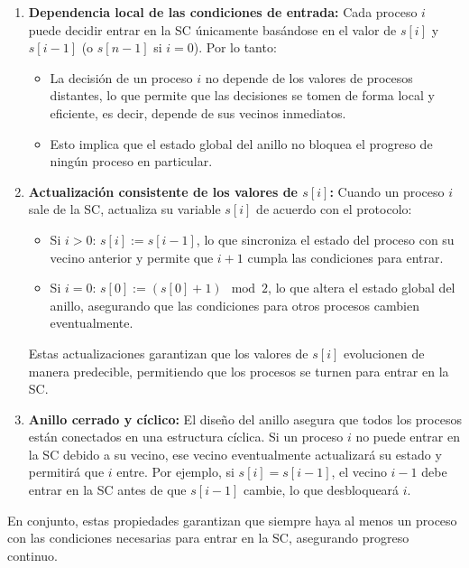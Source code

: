 \documentclass[a4paper,12pt]{article}
\begin{document}
\begin{enumerate}
    \item \textbf{Dependencia local de las condiciones de entrada:}  
    Cada proceso $i$ puede decidir entrar en la SC únicamente basándose en el valor de $s[i]$ y $s[i-1]$ (o $s[n-1]$ si $i = 0$). Por lo tanto:
    \begin{itemize}
        \item La decisión de un proceso $i$ no depende de los valores de procesos distantes, lo que permite que las decisiones se tomen de forma local y eficiente, es decir, depende de sus vecinos inmediatos.
        \item Esto implica que el estado global del anillo no bloquea el progreso de ningún proceso en particular.
    \end{itemize}

    \item \textbf{Actualización consistente de los valores de $s[i]$:}  
    Cuando un proceso $i$ sale de la SC, actualiza su variable $s[i]$ de acuerdo con el protocolo:
    \begin{itemize}
        \item Si $i > 0$: $s[i] := s[i-1]$, lo que sincroniza el estado del proceso con su vecino anterior y permite que $i+1$ cumpla las condiciones para entrar.
        \item Si $i = 0$: $s[0] := (s[0] + 1) \mod 2$, lo que altera el estado global del anillo, asegurando que las condiciones para otros procesos cambien eventualmente.
    \end{itemize}

    Estas actualizaciones garantizan que los valores de $s[i]$ evolucionen de manera predecible, permitiendo que los procesos se turnen para entrar en la SC.

    \item \textbf{Anillo cerrado y cíclico:}  
    El diseño del anillo asegura que todos los procesos están conectados en una estructura cíclica.  
    Si un proceso $i$ no puede entrar en la SC debido a su vecino, ese vecino eventualmente actualizará su estado y permitirá que $i$ entre.  
    Por ejemplo, si $s[i] = s[i-1]$, el vecino $i-1$ debe entrar en la SC antes de que $s[i-1]$ cambie, lo que desbloqueará $i$.
\end{enumerate}

En conjunto, estas propiedades garantizan que siempre haya al menos un proceso con las condiciones necesarias para entrar en la SC, asegurando progreso continuo.
\end{document}
